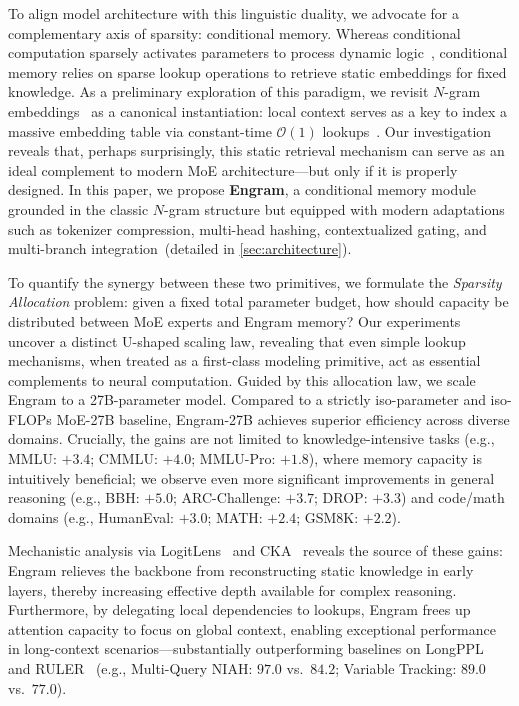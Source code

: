 To align model architecture with this linguistic duality, we advocate for a complementary axis of sparsity: conditional memory. Whereas conditional computation sparsely activates parameters to process dynamic logic~\citep{shazeer2017outrageously,bengio2013estimatingpropagatinggradientsstochastic}, conditional memory relies on sparse lookup operations to retrieve static embeddings for fixed knowledge. As a preliminary exploration of this paradigm, we revisit $N$-gram embeddings~\citep{bojanowski2017enriching} as a canonical instantiation: local context serves as a key to index a massive embedding table via constant-time $\mathcal{O}(1)$ lookups~\citep{tito2017hash,huang2025over,pagnoni2025byte,yu2025scaling}. Our investigation reveals that, perhaps surprisingly, this static retrieval mechanism can serve as an ideal complement to modern MoE architecture—but only if it is properly designed. In this paper, we propose \textbf{Engram}, a conditional memory module grounded in the classic $N$-gram structure but equipped with modern adaptations such as tokenizer compression, multi-head hashing, contextualized gating, and multi-branch integration~(detailed in \autoref{sec:architecture}).

To quantify the synergy between these two primitives, we formulate the \textit{Sparsity Allocation} problem: given a fixed total parameter budget, how should capacity be distributed between MoE experts and Engram memory? Our experiments uncover a distinct U-shaped scaling law, revealing that even simple lookup mechanisms, when treated as a first-class modeling primitive, act as essential complements to neural computation. 
Guided by this allocation law, we scale Engram to a 27B-parameter model. Compared to a strictly iso-parameter and iso-FLOPs MoE-27B baseline, Engram-27B achieves superior efficiency across diverse domains. Crucially, the gains are not limited to knowledge-intensive tasks (e.g., MMLU: $+3.4$; CMMLU: $+4.0$; MMLU-Pro: $+1.8$), where memory capacity is intuitively beneficial; we observe even more significant improvements in general reasoning (e.g., BBH: $+5.0$; ARC-Challenge: $+3.7$; DROP: $+3.3$) and code/math domains (e.g., HumanEval: $+3.0$; MATH: $+2.4$; GSM8K: $+2.2$). 

Mechanistic analysis via LogitLens~\citep{nostalgebraist2020logitlens} and CKA~\citep{hendrycks2020measuring} reveals the source of these gains: Engram relieves the backbone from reconstructing static knowledge in early layers, thereby increasing effective depth available for complex reasoning.
Furthermore, by delegating local dependencies to lookups, Engram frees up attention capacity to focus on global context, enabling exceptional performance in long-context scenarios—substantially outperforming baselines on LongPPL~\citep{fangwrong} and RULER~\citep{hsiehruler} (e.g., Multi-Query NIAH: $97.0$ vs.\ $84.2$; Variable Tracking: $89.0$ vs.\ $77.0$).

